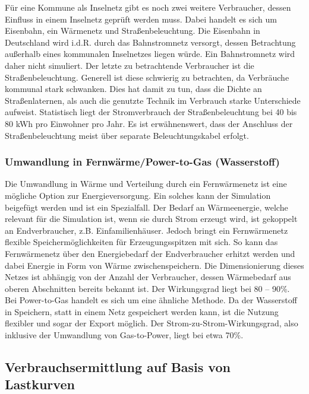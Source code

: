 Für eine Kommune als Inselnetz gibt es noch zwei weitere Verbraucher, dessen Einfluss in einem Inselnetz geprüft werden muss. 
Dabei handelt es sich um Eisenbahn, ein Wärmenetz und Straßenbeleuchtung.
Die Eisenbahn in Deutschland wird i.d.R. durch das Bahnstromnetz versorgt, dessen Betrachtung außerhalb eines kommunalen Inselnetzes liegen würde. 
Ein Bahnstromnetz wird daher nicht simuliert.
Der letzte zu betrachtende Verbraucher ist die Straßenbeleuchtung. 
Generell ist diese schwierig zu betrachten, da Verbräuche kommunal stark schwanken. 
Dies hat damit zu tun, dass die Dichte an Straßenlaternen, als auch die genutzte Technik im Verbrauch starke Unterschiede aufweist. 
Statistisch liegt der Stromverbrauch der Straßenbeleuchtung bei 40 bis 80 kWh pro Einwohner pro Jahr. 
Es ist erwähnenswert, dass der Anschluss der Straßenbeleuchtung meist über separate Beleuchtungskabel erfolgt.

\subsubsection{Umwandlung in Fernwärme/Power-to-Gas (Wasserstoff)}

Die Umwandlung in Wärme und Verteilung durch ein Fernwärmenetz ist eine mögliche Option zur Energieversorgung. 
Ein solches kann der Simulation beigefügt werden und ist ein Spezialfall. 
Der Bedarf an Wärmeenergie, welche relevant für die Simulation ist, wenn sie durch Strom erzeugt wird, ist gekoppelt an Endverbraucher, z.B. Einfamilienhäuser. 
Jedoch bringt ein Fernwärmenetz flexible Speichermöglichkeiten für Erzeugungsspitzen mit sich. 
So kann das Fernwärmenetz über den Energiebedarf der Endverbraucher erhitzt werden und dabei Energie in Form von Wärme zwischenspeichern. 
Die Dimensionierung dieses Netzes ist abhängig von der Anzahl der Verbraucher, dessen Wärmebedarf aus oberen Abschnitten bereits bekannt ist. 
Der Wirkungsgrad liegt bei 80 – 90\%.
Bei Power-to-Gas handelt es sich um eine ähnliche Methode. 
Da der Wasserstoff in Speichern, statt in einem Netz gespeichert werden kann, ist die Nutzung flexibler und sogar der Export möglich. 
Der Strom-zu-Strom-Wirkungsgrad, also inklusive der Umwandlung von Gas-to-Power, liegt bei etwa 70\%.

\subsection{Verbrauchsermittlung auf Basis von Lastkurven}

